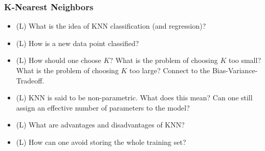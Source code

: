 \subsubsection*{K-Nearest Neighbors}
\begin{itemize}
    \item (L) What is the idea of KNN classification (and regression)?
    \item (L) How is a new data point classified?
    \item (L) How should one choose $K$? What is the problem of choosing $K$ too small? What is the problem of choosing $K$ too large? Connect to the Bias-Variance-Tradeoff.
    \item (L) KNN is said to be non-parametric. What does this mean? Can one still assign an effective number of parameters to the model?
    \item (L) What are advantages and disadvantages of KNN?
    \item (L) How can one avoid storing the whole training set?
\end{itemize}


